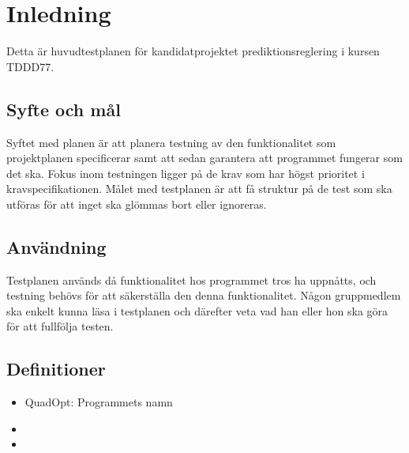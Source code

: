 \section{Inledning}
Detta är huvudtestplanen för kandidatprojektet prediktionsreglering i kursen TDDD77.

\subsection{Syfte och mål}
Syftet med planen är att planera testning av den funktionalitet som projektplanen specificerar samt att sedan garantera att programmet fungerar som det ska. Fokus inom testningen ligger på de krav som har högst prioritet i kravspecifikationen.
Målet med testplanen är att få struktur på de test som ska utföras för att inget ska glömmas bort eller ignoreras.

\subsection{Användning}
Testplanen används då funktionalitet hos programmet tros ha uppnåtts, och testning behövs för att säkerställa den denna funktionalitet. Någon gruppmedlem ska enkelt kunna läsa i testplanen och därefter veta vad han eller hon ska göra för att fullfölja testen.

\subsection{Definitioner}

\begin{itemize}
	\item{QuadOpt: Programmets namn}
	\item{}
	\item{}
\end{itemize}
